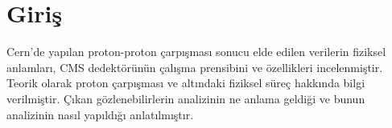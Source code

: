\chapter{Giriş}
Cern'de yapılan proton-proton çarpışması sonucu elde edilen verilerin fiziksel anlamları, CMS dedektörünün çalışma prensibini ve özellikleri incelenmiştir. Teorik olarak proton çarpışması ve altındaki fiziksel süreç hakkında bilgi verilmiştir. Çıkan gözlenebilirlerin analizinin ne anlama geldiği ve bunun analizinin nasıl yapıldığı anlatılmıştır.